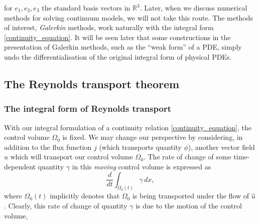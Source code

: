 for $e_1,e_2,e_3$ the standard basis vectors in $\mathbb{R}^3$.
Later, when we discuss numerical methods for solving continuum models, we will not take this route. The methods of interest, \textit{Galerkin} methods,
work naturally with the integral form \eqref{continuity_equation}.
It will be seen later that some constructions in the presentation of Galerkin methods, such as the ``weak form'' of a PDE, simply undo the differentialisation of the original integral form of physical PDEs.
\subsection{The Reynolds transport theorem}
\subsubsection{The integral form of Reynolds transport}
With our integral formulation of a continuity relation \eqref{continuity_equation}, the control volume $\Omega_0$ is fixed.
We may change our perspective by considering, in addition to the flux function $j$ (which transports quantity $\phi$), another
vector field $\hat{u}$ which will transport our control volume $\Omega_0$. The rate of change of some time-dependent quantity $\gamma$ in this
\textit{moving} control volume is expressed as
\begin{equation}\label{reynolds_rate_of_change}
    \frac{d}{dt}\int_{\Omega_0(t)}\gamma\,dx,
\end{equation}
where $\Omega_0(t)$ implicitly denotes that $\Omega_0$ is being transported under the flow of $\hat{u}$.
Clearly, this rate of change of quantity $\gamma$ is due to the motion of the control volume,


